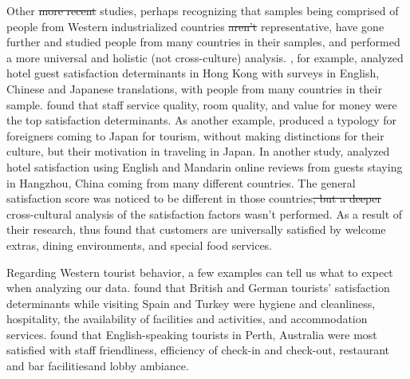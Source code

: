 \documentclass[smallextended,natbib]{svjour3}       %
\providecommand{\DIFadd}[1]{{\protect\color{blue}\uwave{#1}}} %
\providecommand{\DIFdel}[1]{{\protect\color{red}\sout{#1}}}                      %
\providecommand{\DIFaddbegin}{} %
\providecommand{\DIFaddend}{} %
\providecommand{\DIFdelbegin}{} %
\providecommand{\DIFdelend}{} %
\newcommand{\DIFscaledelfig}{0.5}
\newlength{\DIFdelgraphicswidth} %
\newlength{\DIFdelgraphicsheight} %
\newcommand{\DIFaddincludegraphics}[2][]{{\color{blue}\fbox{\DIFOincludegraphics[#1]{#2}}}} %
\newcommand{\DIFdelincludegraphics}[2][]{%
\sbox{\DIFdelgraphicsbox}{\DIFOincludegraphics[#1]{#2}}%
\settoboxwidth{\DIFdelgraphicswidth}{\DIFdelgraphicsbox} %
\settoboxtotalheight{\DIFdelgraphicsheight}{\DIFdelgraphicsbox} %
\scalebox{\DIFscaledelfig}{%
\parbox[b]{\DIFdelgraphicswidth}{\usebox{\DIFdelgraphicsbox}\\[-\baselineskip] \rule{\DIFdelgraphicswidth}{0em}}\llap{\resizebox{\DIFdelgraphicswidth}{\DIFdelgraphicsheight}{%
\setlength{\unitlength}{\DIFdelgraphicswidth}%
\begin{picture}(1,1)%
\thicklines\linethickness{2pt} %
{\color[rgb]{1,0,0}\put(0,0){\framebox(1,1){}}}%
{\color[rgb]{1,0,0}\put(0,0){\line( 1,1){1}}}%
{\color[rgb]{1,0,0}\put(0,1){\line(1,-1){1}}}%
\end{picture}%
}\hspace*{3pt}}} %
} %
\DeclareRobustCommand{\DIFaddbegin}{\DIFOaddbegin \let\includegraphics\DIFaddincludegraphics} %
\DeclareRobustCommand{\DIFaddend}{\DIFOaddend \let\includegraphics\DIFOincludegraphics} %
\DeclareRobustCommand{\DIFdelbegin}{\DIFOdelbegin \let\includegraphics\DIFdelincludegraphics} %
\DeclareRobustCommand{\DIFdelend}{\DIFOaddend \let\includegraphics\DIFOincludegraphics} %
\begin{document}
\DIFaddend %
Other \DIFdelbegin \DIFdel{more recent }\DIFdelend studies, perhaps recognizing that samples being comprised of people from Western industrialized countries \DIFdelbegin \DIFdel{aren't }\DIFdelend \DIFaddbegin \DIFadd{are not }\DIFaddend representative, have gone further and studied people from many countries in their samples, and performed a more universal and holistic (not cross-culture) analysis. \cite{choi2001}, for example, analyzed hotel guest satisfaction determinants in Hong Kong with surveys in English, Chinese and Japanese translations, with people from many countries in their sample. \cite{choi2001} found that staff service quality, room quality, and value for money were the top satisfaction determinants. As another example, \cite{Uzama2012} produced a typology for foreigners coming to Japan for tourism, without making distinctions for their culture, but their motivation in traveling in Japan. In another study, \cite{zhou2014} analyzed hotel satisfaction using English and Mandarin online reviews from guests staying in Hangzhou, China coming from many different countries. The general satisfaction score was noticed to be different in those countries\DIFdelbegin \DIFdel{, but a deeper }\DIFdelend \DIFaddbegin \DIFadd{. However, a more in-depth }\DIFaddend cross-cultural analysis of the satisfaction factors wasn't performed. As a result of their research, \cite{zhou2014} thus found that customers are universally satisfied by welcome extras, dining environments, and special food services. 

Regarding Western tourist behavior, a few examples can tell us what to expect when analyzing our data. \cite{kozak2002} found that British and German tourists' satisfaction determinants while visiting Spain and Turkey were hygiene and cleanliness, hospitality, the availability of facilities and activities, and accommodation services. \cite{shanka2004} found that English-speaking tourists in Perth, Australia were most satisfied with staff friendliness, \DIFaddbegin \DIFadd{the }\DIFaddend efficiency of check-in and check-out, restaurant and bar facilities\DIFaddbegin \DIFadd{, }\DIFaddend and lobby ambiance. 
\end{document}

